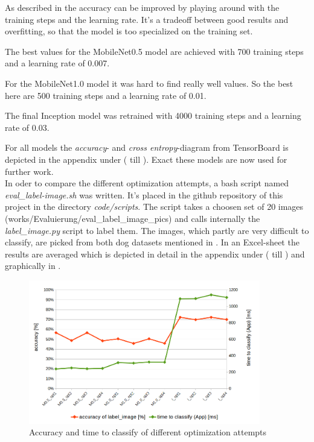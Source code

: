
As described in  the accuracy can be improved by playing around with the training steps and the learning rate. It's a tradeoff between good results and overfitting, so that the model is too specialized on the training set.

The best values for the MobileNet0.5 model are achieved with 700 training steps and a learning rate of 0.007.

For the MobileNet1.0 model it was hard to find really well values. So the best here are 500 training steps and a learning rate of 0.01.

The final Inception model was retrained with 4000 training steps and a learning rate of 0.03.

For all models the \textit{accuracy}- and \textit{cross entropy}-diagram from TensorBoard is depicted in the appendix under  ( till ). Exact these models are now used for further work.\\



In oder to compare the different optimization attempts, a bash script named \textit{eval_label-image.sh} was written. It's placed in the github repository of this project in the directory \textit{code/scripts}. The script takes a choosen set of 20 images (works/Evaluierung/eval_label_image_pics) and calls internally the \textit{label_image.py} script to label them. The images, which partly are very difficult to classify, are picked from both dog datasets mentioned in . In an Excel-sheet the results are averaged which is depicted in detail in the appendix under  ( till ) and graphically in .  \\

\begin{figure}[htbp]
\centering
\includegraphics[width=0.9\textwidth]{includes/evalAccTime2}
\caption{Accuracy and time to classify of different optimization attempts}
\label{fig:evalAccTime2}
\end{figure}

